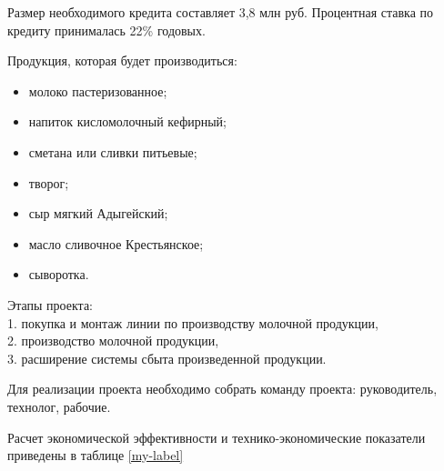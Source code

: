 Размер необходимого кредита составляет 3,8 млн руб. Процентная ставка по кредиту принималась 22\% годовых.


Продукция, которая будет производиться:
\begin{itemize}
	\item молоко пастеризованное; 
	\item напиток кисломолочный кефирный; 
	\item сметана или сливки питьевые; 
	\item творог; 
	\item сыр мягкий Адыгейский; 
	\item масло сливочное Крестьянское; 
	\item сыворотка.
\end{itemize} 

Этапы проекта:\\
1.	покупка и монтаж линии по производству молочной продукции, \\
2.	производство молочной продукции, \\
3.	расширение системы сбыта произведенной продукции. 

Для реализации проекта необходимо собрать команду проекта: руководитель, технолог, рабочие.

Расчет экономической эффективности и технико-экономические показатели приведены в таблице \ref{my-label}

